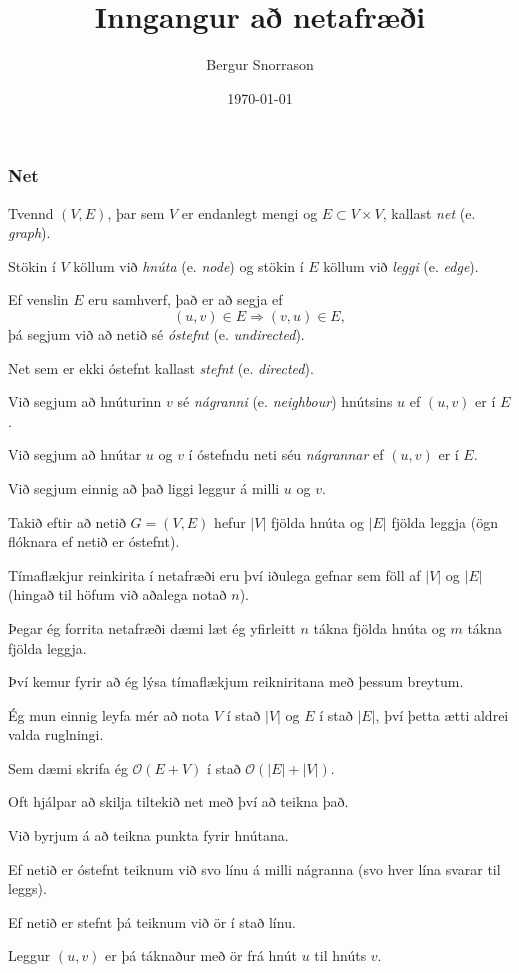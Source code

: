\title{Inngangur að netafræði}
\author{Bergur Snorrason}
\date{\today}



\frame{\titlepage}

{
	\frametitle{Net}
	{
		\item<1-> Tvennd $(V, E)$, þar sem $V$ er endanlegt mengi og $E \subset V \times V$, kallast \emph{net} (e. \emph{graph}).
		\item<2-> Stökin í $V$ köllum við \emph{hnúta} (e. \emph{node}) og stökin í $E$ köllum við \emph{leggi} (e. \emph{edge}).
		\item<3-> Ef venslin $E$ eru samhverf, það er að segja ef 
					\[
						(u, v) \in E \Rightarrow (v, u) \in E,
					\]
					þá segjum við að netið sé \emph{óstefnt} (e. \emph{undirected}).
		\item<4-> Net sem er ekki óstefnt kallast \emph{stefnt} (e. \emph{directed}).
		\item<5-> Við segjum að hnúturinn $v$ sé \emph{nágranni} (e. \emph{neighbour}) hnútsins $u$ ef $(u, v)$ er í $E$.
		\item<6-> Við segjum að hnútar $u$ og $v$ í óstefndu neti séu \emph{nágrannar} ef $(u, v)$ er í $E$.
		\item<7-> Við segjum einnig að það liggi leggur á milli $u$ og $v$.
	}
}

{
	{
		\item<1-> Takið eftir að netið $G = (V, E)$ hefur $|V|$ fjölda hnúta og $|E|$ fjölda leggja (ögn flóknara ef netið er óstefnt).
		\item<2-> Tímaflækjur reinkirita í netafræði eru því iðulega gefnar sem föll af $|V|$ og $|E|$ (hingað til höfum við aðalega notað $n$).
		\item<3-> Þegar ég forrita netafræði dæmi læt ég yfirleitt $n$ tákna fjölda hnúta og $m$ tákna fjölda leggja.
		\item<4-> Því kemur fyrir að ég lýsa tímaflækjum reikniritana með þessum breytum.
		\item<5-> Ég mun einnig leyfa mér að nota $V$ í stað $|V|$ og $E$ í stað $|E|$, því þetta ætti aldrei valda ruglningi.
		\item<6-> Sem dæmi skrifa ég $\mathcal{O}(E + V)$ í stað $\mathcal{O}(|E| + |V|)$.
	}
}

{
	{
		\item<1-> Oft hjálpar að skilja tiltekið net með því að teikna það.
		\item<2-> Við byrjum á að teikna punkta fyrir hnútana.
		\item<3-> Ef netið er óstefnt teiknum við svo línu á milli nágranna (svo hver lína svarar til leggs).
		\item<4-> Ef netið er stefnt þá teiknum við ör í stað línu.
		\item<5-> Leggur $(u, v)$ er þá táknaður með ör frá hnút $u$ til hnúts $v$.
	}
}


